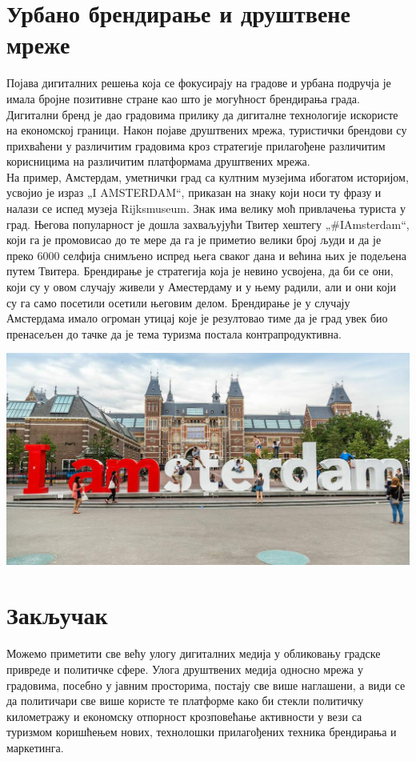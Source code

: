 \documentclass{article}
\begin{document}
\begin{multicols}{3}
\section*{Урбано брендирање и друштвене мреже}
\noindent Појава дигиталних решења која се фокусирају на градове и урбана подручја је имала бројне позитивне стране као што је могућност брендирања града. Дигитални бренд је дао градовима прилику да дигиталне технологије искористе на економској граници. Након појаве друштвених мрежа, туристички брендови су прихваћени у различитим градовима кроз стратегије прилагођене различитим корисницима на различитим платформама друштвених мрежа. \\
На пример, Амстердам, уметнички град са култним музејима ибогатом историјом, усвојио је израз „I AMSTERDAM“, приказан на знаку који носи ту фразу и налази се испед музеја Rijksmuseum. Знак има велику моћ привлачења туриста у град. Његова популарност је дошла захваљујући Твитер хештегу „#IAmsterdam“, који га је промовисао до те мере да га је приметио велики број људи и да је преко 6000 селфија снимљено испред њега сваког дана и већина њих је подељена путем Твитера. Брендирање је стратегија која је невино усвојена, да би се они, који су у овом случају живели у Аместердаму и у њему радили, али и они који су га само посетили осетили његовим делом. Брендирање је у случају Амстердама имало огроман утицај које је резултовао тиме да је град увек био пренасељен до тачке да је тема туризма постала контрапродуктивна.

\begin{center}
    \vspace{1cm}
    \includegraphics[width=0.9\linewidth]{media/images/rijksmuseum-amsterdam-museum-iamsterdam.jpg}
\end{center}

\section*{Закључак}

\noindent Можемо приметити све већу улогу дигиталних медија у
обликовању градске привреде и политичке сфере. Улога друштвених медија односно мрежа у градовима, посебно у јавним просторима, постају све више наглашени, а види се да политичари све више користе те платформе како би стекли политичку километражу и економску отпорност крозповећање активности у вези са туризмом коришћењем нових, технолошки прилагођених техника брендирања и маркетинга.
%

\end{multicols}
\end{document}
